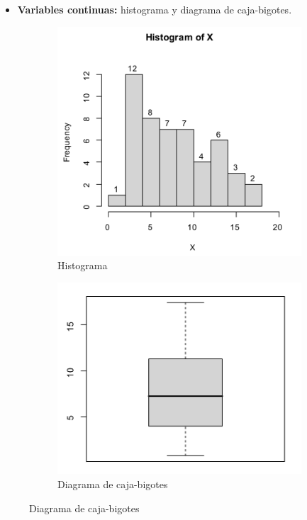 \begin{itemize}
	\item \textbf{Variables continuas:} histograma y diagrama de caja-bigotes.
\end{itemize}

\begin{figure}[h]
	\begin{subfigure}{0.5\textwidth}
		\centering
		\includegraphics[width=0.9\linewidth]{"Temas/Imagenes/Tema 1/Histograma"}
		\caption*{Histograma}
	\end{subfigure}
	\begin{subfigure}{0.5\textwidth}
		\centering
		\includegraphics[width=0.9\linewidth]{"Temas/Imagenes/Tema 1/Diagrama de caja-bigotes"}
		\caption*{Diagrama de caja-bigotes}
	\end{subfigure}
\end{figure}
\newpage
